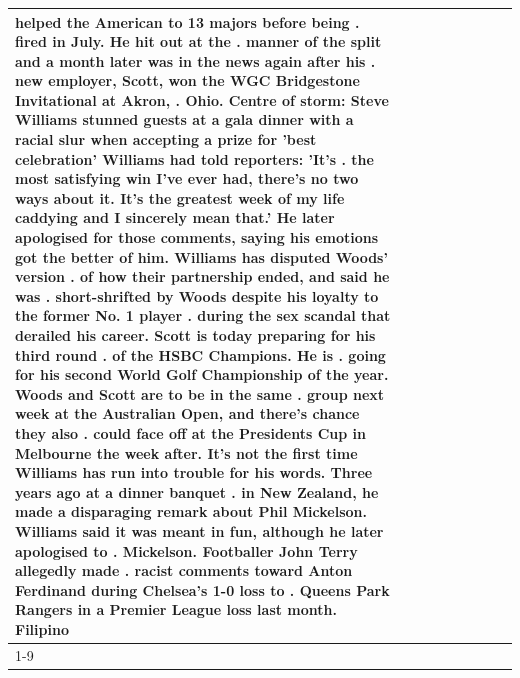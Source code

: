 \begin{table}[H]
\begin{tabular}{lllrlllll}
helped the American to 13 majors before being . fired in July. He hit out at the . manner of the split and a month later was in the news again after his . new employer, Scott, won the WGC Bridgestone Invitational at Akron, . Ohio. Centre of storm: Steve Williams stunned guests at a gala dinner with a racial slur when accepting a prize for 'best celebration' Williams had told reporters: 'It's . the most satisfying win I've ever had, there's no two ways about it. It's the greatest week of my life caddying and I sincerely mean that.' He later apologised for those comments, saying his emotions got the better of him. Williams has disputed Woods' version . of how their partnership ended, and said he was . short-shrifted by Woods despite his loyalty to the former No. 1 player . during the sex scandal that derailed his career. Scott is today preparing for his third round . of the HSBC Champions. He is . going for his second World Golf Championship of the year. Woods and Scott are to be in the same . group next week at the Australian Open, and there's chance they also . could face off at the Presidents Cup in Melbourne the week after. It's not the first time Williams has run into trouble for his words. Three years ago at a dinner banquet . in New Zealand, he made a disparaging remark about Phil Mickelson. Williams said it was meant in fun, although he later apologised to . Mickelson. Footballer John Terry allegedly made . racist comments toward Anton Ferdinand during Chelsea's 1-0 loss to . Queens Park Rangers in a Premier League loss last month. Filipino \\
\cline{1-9}

\end{tabular}
\end{table}
